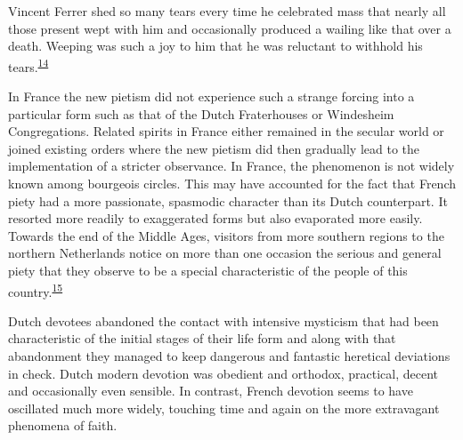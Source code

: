 Vincent Ferrer shed so many tears every time he celebrated mass that
nearly all those present wept with him and occasionally produced a
wailing like that over a death. Weeping was such a joy to him that he
was reluctant to withhold his
tears.\textsuperscript{\protect\hypertarget{15_Chapter_Eight__RELIGIOUS_EXCITAT.xhtmlux5cux23id_879}{\protect\hyperlink{23_NOTES.xhtmlux5cux23id_880}{14}}}

In France the new pietism did not experience such a strange forcing into
a particular form such as that of the Dutch Fraterhouses or Windesheim
Congregations. Related spirits in France either remained in the secular
world or joined existing orders where the new pietism did then gradually
lead to the implementation of a stricter observance. In France, the
phenomenon is not widely known among bourgeois circles. This may have
accounted for the fact that French piety had a more passionate,
spasmodic character than its Dutch counterpart. It resorted more readily
to exaggerated forms but also evaporated more easily. Towards the end of
the Middle Ages, visitors from more southern regions to the northern
Netherlands notice on more than one occasion the serious and general
piety that they observe to be a special characteristic of the people of
this
country.\textsuperscript{\protect\hypertarget{15_Chapter_Eight__RELIGIOUS_EXCITAT.xhtmlux5cux23id_877}{\protect\hyperlink{23_NOTES.xhtmlux5cux23id_878}{15}}}

Dutch devotees abandoned the contact with intensive mysticism that had
been characteristic of the initial stages of their life form and along
with that abandonment they managed to keep dangerous and fantastic
heretical deviations in check. Dutch modern devotion was obedient and
orthodox, practical, decent and occasionally even sensible. In contrast,
French devotion seems to have oscillated much more widely, touching time
and again on the more extravagant phenomena of faith.

